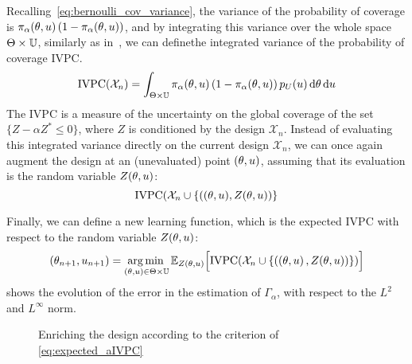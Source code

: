 \documentclass[../../Main_ManuscritThese.tex]{subfiles}
\newcommand\imgpath{/home/victor/acadwriting/Manuscrit/Text/Chapter4/img/}
\begin{document}

Recalling~\cref{eq:bernoulli_cov_variance}, the variance of the
probability of coverage is
$\pi_\alpha(\theta, u) \left(1 - \pi_{\alpha}(\theta,u)\right)$, and by
integrating this variance over the whole space
$\Theta \times \mathbb{U}$, similarly as in~\cite{bect_sequential_2012},
we can definethe integrated variance of the probability of coverage
$\mathrm{IVPC}$.
\begin{equation}
  \label{eq:IVPC_def}
  \mathrm{IVPC}(\mathcal{X}_n) =  \int_{\Theta \times \mathbb{U}} \pi_{\alpha}(\theta, u) \left(1 - \pi_{\alpha}(\theta, u)\right)p_{U}(u)\,\mathrm{d}\theta \,\mathrm{d}u
\end{equation}
The $\mathrm{IVPC}$ is a measure of the uncertainty on the global
coverage of the set $\{Z - \alpha Z^* \leq 0\}$, where $Z$ is
conditioned by the design $\mathcal{X}_n$. Instead of evaluating this
integrated variance directly on the current design $\mathcal{X}_n$, we
can once again augment the design at an (unevaluated) point
$(\theta, u)$, assuming that its evaluation is the random variable
$Z(\theta, u)$:
\begin{equation}
  \mathrm{IVPC}(\mathcal{X}_n \cup \{((\theta, u), Z(\theta, u))\}
\end{equation}

Finally, we can define a new learning function, which is the expected
$\mathrm{IVPC}$ with respect to the random variable $Z(\theta, u)$:
\begin{equation}
  \label{eq:expected_aIVPC}
  (\theta_{n+1},u_{n+1}) = \operatorname*{arg\,min \,}_{(\theta, u)\in \Theta\times\mathbb{U}} \mathbb{E}_{Z(\theta, u)}\Big[\mathrm{IVPC}(\mathcal{X}_n \cup \{   \left(\left(\theta, u \right), Z(\theta, u) \right)  \} )     \Big]
\end{equation}
 shows the evolution of the error in the
estimation of $\Gamma_{\alpha}$, with respect to the $L^2$ and
$L^{\infty}$ norm.
\begin{figure}[ht]
  \centering
  
  \caption{\label{fig:IVPC_enrichment} Enriching the design according to the criterion of \cref{eq:expected_aIVPC}}
\end{figure}
\end{document}

